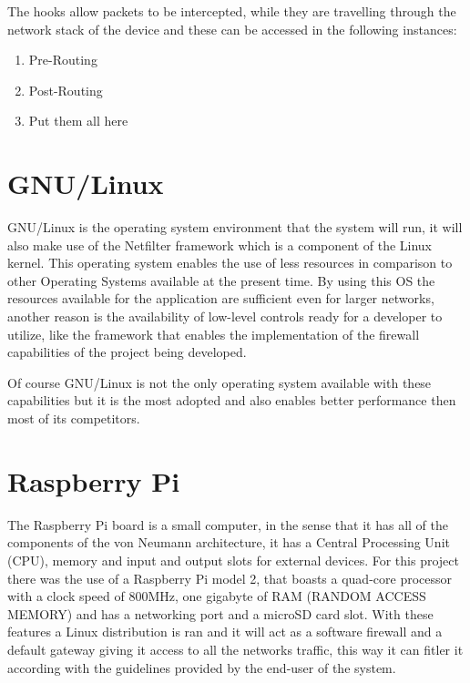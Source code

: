 The hooks allow packets to be intercepted, while they are travelling through the
network stack of the device and these can be accessed in the following
instances:
\begin{enumerate}
	\item Pre-Routing
	\item Post-Routing
	\item Put them all here
\end{enumerate}

\section{GNU/Linux}
\label{chap3:sec:gnux}
GNU/Linux is the operating system environment that the system will run, it will
also make use of the Netfilter framework which is a component of the Linux
kernel. This operating system enables the use of less resources in comparison to
other Operating Systems available at the present time.
By using this OS the resources available for the application are sufficient even
for larger networks, another reason is the availability of low-level controls
ready for a developer to utilize, like the framework that enables the
implementation of the firewall capabilities of the project being developed.

Of course GNU/Linux is not the only operating system available with these
capabilities but it is the most adopted and also enables better performance then
most of its competitors.

\section{Raspberry Pi}
\label{chap3:sec:rasp}
The Raspberry Pi board is a small computer, in the sense that it has all of the
components of the von Neumann architecture, it has a Central Processing Unit
(CPU), memory and input and output slots for external devices.
For this project there was the use of a Raspberry Pi model 2, that boasts a
quad-core processor with a clock speed of 800MHz, one gigabyte of RAM (RANDOM
ACCESS MEMORY) and has a networking port and a microSD card slot. With these
features a Linux distribution is ran and it will act as a software firewall and
a default gateway giving it access to all the networks traffic, this way it can
fitler it according with the guidelines provided by the end-user of the system.

